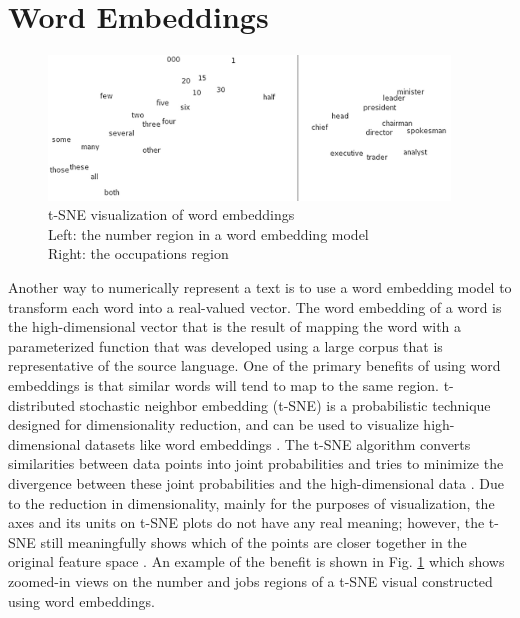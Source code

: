 \section{Word Embeddings}

\begin{figure}[h]
\centering
\captionsetup{justification=centering,width=0.95\textwidth}
\centerline{\includegraphics[width=0.95\textwidth]{similarWordVectors.png}}
\caption[t-SNE Visual of Numbers and Occupations]{
    t-SNE visualization of word embeddings \cite{wordEmbeddingImg}\\
    Left: the number region in a word embedding model\\
    Right: the occupations region
}
\label{fig:similarWordVectors}
\end{figure}


Another way to numerically represent a text is to use a word embedding model to transform each word into a real-valued vector.  The word embedding of a word is the high-dimensional vector that is the result of mapping the word with a parameterized function that was developed using a large corpus that is representative of the source language.  One of the primary benefits of using word embeddings is that similar words will tend to map to the same region.  t-distributed stochastic neighbor embedding (t-SNE) is a probabilistic technique designed for dimensionality reduction, and can be used to visualize high-dimensional datasets like word embeddings \cite{tsneAbout}.  The t-SNE algorithm converts similarities between data points into joint probabilities and tries to minimize the divergence between these joint probabilities and the high-dimensional data \cite{tsneVisual, tsnePython}.  Due to the reduction in dimensionality, mainly for the purposes of visualization, the axes and its units on t-SNE plots do not have any real meaning; however, the t-SNE still meaningfully shows which of the points are closer together in the original feature space \cite{tsneAxes}.  An example of the benefit is shown in Fig. \ref{fig:similarWordVectors} which shows zoomed-in views on the number and jobs regions of a t-SNE visual constructed using word embeddings.


